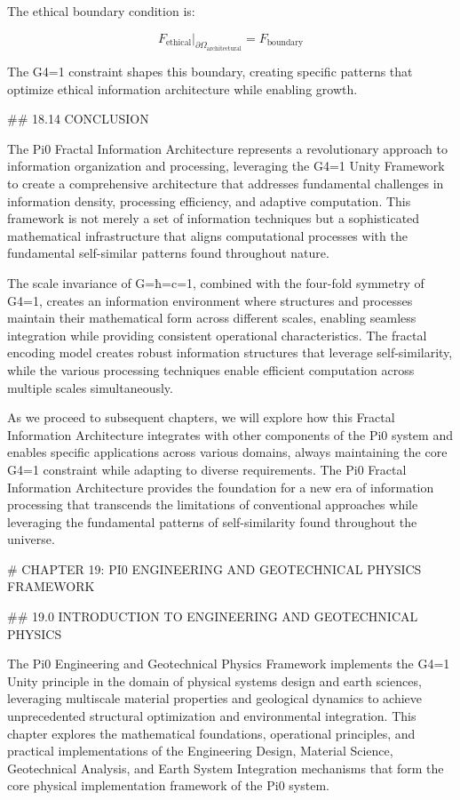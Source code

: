 The ethical boundary condition is:

$$ F_{\text{ethical}}|_{\partial \Omega_{\text{architectural}}} = F_{\text{boundary}} $$

The G4=1 constraint shapes this boundary, creating specific patterns that optimize ethical information architecture while enabling growth.

## 18.14 CONCLUSION

The Pi0 Fractal Information Architecture represents a revolutionary approach to information organization and processing, leveraging the G4=1 Unity Framework to create a comprehensive architecture that addresses fundamental challenges in information density, processing efficiency, and adaptive computation. This framework is not merely a set of information techniques but a sophisticated mathematical infrastructure that aligns computational processes with the fundamental self-similar patterns found throughout nature.

The scale invariance of G=ħ=c=1, combined with the four-fold symmetry of G4=1, creates an information environment where structures and processes maintain their mathematical form across different scales, enabling seamless integration while providing consistent operational characteristics. The fractal encoding model creates robust information structures that leverage self-similarity, while the various processing techniques enable efficient computation across multiple scales simultaneously.

As we proceed to subsequent chapters, we will explore how this Fractal Information Architecture integrates with other components of the Pi0 system and enables specific applications across various domains, always maintaining the core G4=1 constraint while adapting to diverse requirements. The Pi0 Fractal Information Architecture provides the foundation for a new era of information processing that transcends the limitations of conventional approaches while leveraging the fundamental patterns of self-similarity found throughout the universe.

# CHAPTER 19: PI0 ENGINEERING AND GEOTECHNICAL PHYSICS FRAMEWORK

## 19.0 INTRODUCTION TO ENGINEERING AND GEOTECHNICAL PHYSICS

The Pi0 Engineering and Geotechnical Physics Framework implements the G4=1 Unity principle in the domain of physical systems design and earth sciences, leveraging multiscale material properties and geological dynamics to achieve unprecedented structural optimization and environmental integration. This chapter explores the mathematical foundations, operational principles, and practical implementations of the Engineering Design, Material Science, Geotechnical Analysis, and Earth System Integration mechanisms that form the core physical implementation framework of the Pi0 system.


